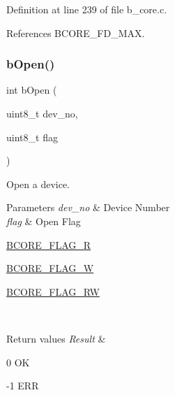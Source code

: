 Definition at line 239 of file b\+\_\+core.\+c.



References B\+C\+O\+R\+E\+\_\+\+F\+D\+\_\+\+M\+AX.

\mbox{\label{group___c_o_r_e___exported___functions_ga249e47165f733672eae3653fcca87829}} 
\subsubsection{\texorpdfstring{b\+Open()}{bOpen()}}
{\footnotesize\ttfamily int b\+Open (\begin{DoxyParamCaption}\item[{uint8\+\_\+t}]{dev\+\_\+no,  }\item[{uint8\+\_\+t}]{flag }\end{DoxyParamCaption})}



Open a device. 


\begin{DoxyParams}{Parameters}
{\em dev\+\_\+no} & Device Number \\
\hline
{\em flag} & Open Flag \begin{DoxyItemize}
\item \mbox{\hyperlink{group___c_o_r_e___exported___defines_ga9632edfe3a6652c254922f0fc6e4315c}{B\+C\+O\+R\+E\+\_\+\+F\+L\+A\+G\+\_\+R}} \item \mbox{\hyperlink{group___c_o_r_e___exported___defines_ga5e134ab3ebc11db6d585cfc1a48aadf0}{B\+C\+O\+R\+E\+\_\+\+F\+L\+A\+G\+\_\+W}} \item \mbox{\hyperlink{group___c_o_r_e___exported___defines_ga0198147efa03609c64760662bd8ea00c}{B\+C\+O\+R\+E\+\_\+\+F\+L\+A\+G\+\_\+\+RW}} \end{DoxyItemize}
\\
\hline
\end{DoxyParams}

\begin{DoxyRetVals}{Return values}
{\em Result} & \begin{DoxyItemize}
\item 0 OK \item -\/1 E\+RR \end{DoxyItemize}
\\
\hline
\end{DoxyRetVals}


